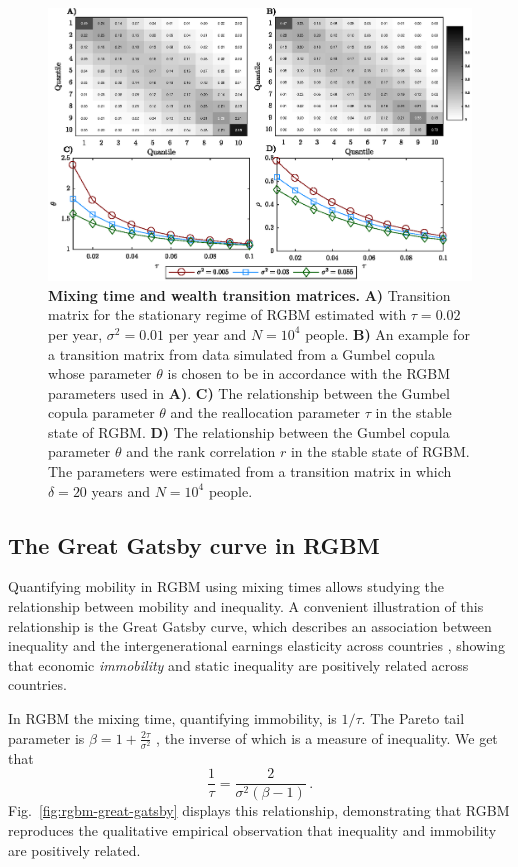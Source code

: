 \documentclass[11pt]{article}
\newcommand{\fref}[1]{Fig.~\ref{fig:#1}}
\newcommand{\be}{\begin{equation}}
\newcommand{\ee}{\end{equation}}
\numberwithin{equation}{section}
\begin{document}
\begin{figure}[!htb]
\centering
\includegraphics[width=1.0\textwidth]{figs/fig_rgbm_gumbel_v2.eps}
\caption{\textbf{Mixing time and wealth transition matrices.} \textbf{A)} Transition matrix for the stationary regime of RGBM estimated with $\tau = 0.02$ per year, $\sigma^2 = 0.01$ per year and $N = 10^4$ people. \textbf{B)} An example for a transition matrix from data simulated from a Gumbel copula whose parameter $\theta$ is chosen to be in accordance with the RGBM parameters used in \textbf{A)}. \textbf{C)} The relationship between the Gumbel copula parameter $\theta$ and the reallocation parameter $\tau$ in the stable state of RGBM. \textbf{D)} The relationship between the Gumbel copula parameter $\theta$ and the rank correlation $r$ in the stable state of RGBM. The parameters were estimated from a transition matrix in which $\delta = 20$ years and $N = 10^4$ people.
\label{fig:rgbm-wealth-matrices}}
\end{figure}
\FloatBarrier

\subsection{The Great Gatsby curve in RGBM}

Quantifying mobility in RGBM using mixing times allows studying the relationship between mobility and inequality. A convenient illustration of this relationship is the Great Gatsby curve, which describes an association between inequality and the intergenerational earnings elasticity across countries \citep{krueger2012,corak2013}, showing that economic \textit{immobility} and static inequality are positively related across countries.

In RGBM the mixing time, quantifying immobility, is $1/\tau$. The Pareto tail parameter is $\beta = 1 + \frac{2\tau}{\sigma^2}$ \citep{BermanPetersAdamou2019}, the inverse of which is a measure of inequality. We get that
%
\be
\frac{1}{\tau} = \frac{2}{\sigma^2\left(\beta - 1\right)}\,.
\ee
%
\fref{rgbm-great-gatsby} displays this relationship, demonstrating that RGBM reproduces the qualitative empirical observation that inequality and immobility are positively related.
\end{document}
